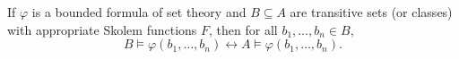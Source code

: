 If $\varphi$ is a bounded formula of set theory and $B \subseteq A$ are transitive sets (or classes) with appropriate Skolem functions $F$, then for all $b_1, \ldots, b_n \in B$,
$$B \models \varphi(b_1, \ldots, b_n) \leftrightarrow A \models \varphi(b_1, \ldots, b_n).$$
